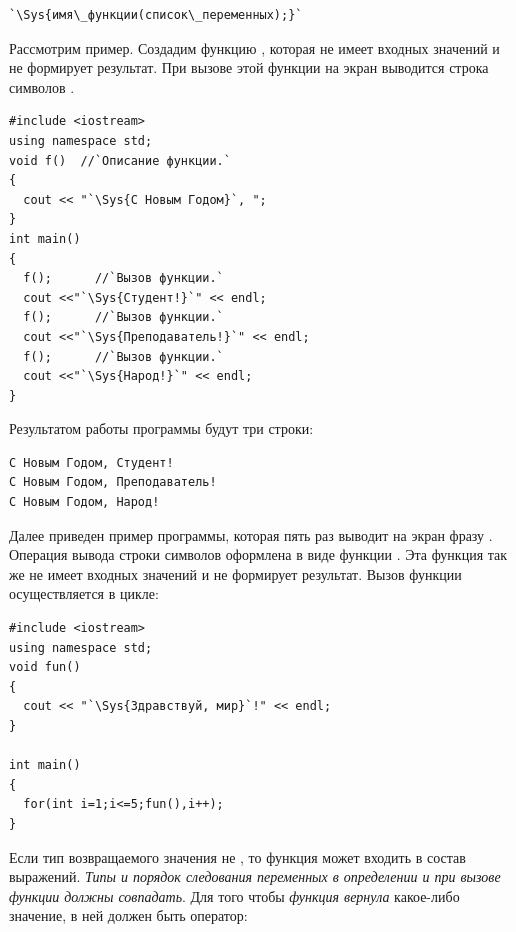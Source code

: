 \begin{lstlisting}
`\Sys{имя\_функции(список\_переменных);}`
\end{lstlisting}

Рассмотрим пример. Создадим функцию , которая не имеет входных значений и не формирует результат.
При вызове этой функции на экран выводится строка символов .

\begin{lstlisting}
#include <iostream>
using namespace std;
void f()  //`Описание функции.`
{
  cout << "`\Sys{С Новым Годом}`, ";
}
int main()
{
  f();      //`Вызов функции.`
  cout <<"`\Sys{Студент!}`" << endl;
  f();      //`Вызов функции.`
  cout <<"`\Sys{Преподаватель!}`" << endl;
  f();      //`Вызов функции.`
  cout <<"`\Sys{Народ!}`" << endl;
}
\end{lstlisting}

Результатом работы программы будут три строки:
\begin{verbatim}
С Новым Годом, Студент!
С Новым Годом, Преподаватель!
С Новым Годом, Народ!
\end{verbatim}

Далее приведен пример программы, которая пять раз выводит на экран фразу . Операция вывода строки символов оформлена в виде функции . Эта функция так же
не имеет входных значений и не формирует результат. Вызов функции осуществляется в цикле:
\begin{lstlisting}
#include <iostream>
using namespace std;
void fun()
{
  cout << "`\Sys{Здравствуй, мир}`!" << endl;
}

int main()
{
  for(int i=1;i<=5;fun(),i++);
}
\end{lstlisting}

Если тип возвращаемого значения не , то функция может входить в состав выражений.
\emph{Типы и порядок следования переменных в определении и при вызове функции должны совпадать}. Для того
чтобы \emph{функция вернула} какое-либо значение, в ней должен быть
оператор: 


